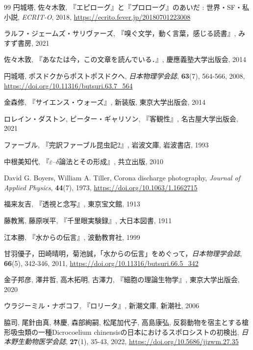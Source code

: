 \documentclass[10pt, a5paper, twoside]{ltjsarticle}
\begin{document}
\begin{thebibliography}{99}
         円城塔, 佐々木敦, 『エピローグ』と『プロローグ』のあいだ : 世界・SF・私小説, \textit{ECRIT-O}, 2018, \url{https://ecrito.fever.jp/20180701223008}

         ラルフ・ジェームズ・サリヴァーズ, 『嗅ぐ文学，動く言葉，感じる読書』, みすず書房, 2021

         佐々木敦, 『あなたは今，この文章を読んでいる．』, 慶應義塾大学出版会, 2014

         円城塔, ポスドクからポストポスドクへ, \textit{日本物理学会誌}, \textbf{63}(7), 564-566, 2008, \url{https://doi.org/10.11316/butsuri.63.7_564}

         金森修, 『サイエンス・ウォーズ』, 新装版, 東京大学出版会, 2014

         ロレイン・ダストン, ピーター・ギャリソン, 『客観性』, 名古屋大学出版会, 2021

         ファーブル, 『完訳ファーブル昆虫記2』, 岩波文庫, 岩波書店, 1993

         中根美知代, 『$\varepsilon$--$\delta$論法とその形成』, 共立出版, 2010

         David G. Boyers, William A. Tiller, Corona discharge photography, \textit{Journal of Applied Physics}, \textbf{44}(7), 1973, \url{https://doi.org/10.1063/1.1662715}

         福来友吉, 『透視と念写』, 東京宝文館, 1913

         藤教篤, 藤原咲平, 『千里眼実験録』, 大日本図書, 1911

         江本勝, 『水からの伝言』, 波動教育社, 1999

         甘羽優子，田崎晴明，菊池誠，「水からの伝言」をめぐって，\textit{日本物理学会誌}, \textbf{66}(5), 342-346, 2011, \url{https://doi.org/10.11316/butsuri.66.5_342}

         金子邦彦, 澤井哲, 高木拓明, 古澤力, 『細胞の理論生物学』, 東京大学出版会, 2020

         ウラジーミル・ナボコフ, 『ロリータ』, 新潮文庫, 新潮社, 2006

         脇司, 尾針由真, 林慶, 森部絢嗣, 松尾加代子, 高島康弘, 反芻動物を宿主とする槍形吸虫類の一種Dicrocoelium chinensisの日本におけるスポロシストの初検出, \textit{日本野生動物医学会誌}, \textbf{27}(1), 35-43, 2022, \url{https://doi.org/10.5686/jjzwm.27.35}


\end{thebibliography}
\end{document}
